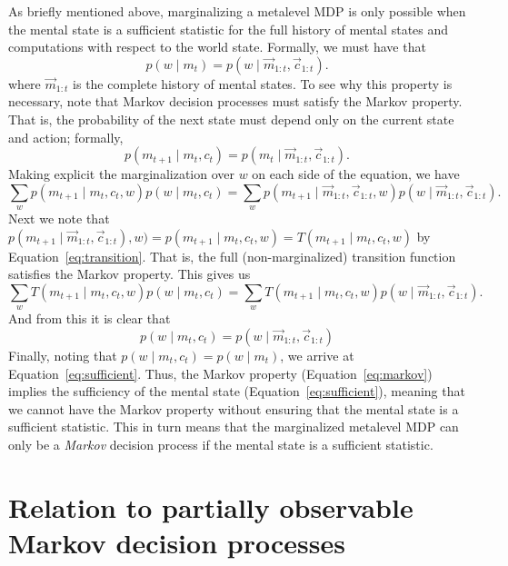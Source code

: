 As briefly mentioned above, marginalizing a metalevel MDP is only possible when the mental state is a sufficient statistic for the full history of mental states and computations with respect to the world state. Formally, we must have that
%
\begin{equation}\label{eq:sufficient}
  p(w \mid m_t) = p(w \mid \vec{m}_{1:t}, \vec{c}_{1:t}).
\end{equation}
%
where $\vec{m}_{1:t}$ is the complete history of mental states. To see why this property is necessary, note that Markov decision processes must satisfy the Markov property. That is, the probability of the next state must depend only on the current state and action; formally,
\begin{equation}\label{eq:markov}
  p(m_{t+1} \mid m_t, c_t) = p(m_t \mid \vec{m}_{1:t}, \vec{c}_{1:t}).
\end{equation}
Making explicit the marginalization over $w$ on each side of the equation, we have
\begin{equation}
  \sum_w p(m_{t+1} \mid m_t, c_t, w) p(w \mid m_t, c_t) =
  \sum_w p(m_{t+1} \mid \vec{m}_{1:t}, \vec{c}_{1:t}, w) p(w \mid \vec{m}_{1:t}, \vec{c}_{1:t}).
\end{equation}
Next we note that $p(m_{t+1} \mid \vec{m}_{1:t}, \vec{c}_{1:t}), w) = p(m_{t+1} \mid m_t, c_t, w) = T(m_{t+1} \mid m_t, c_t, w)$ by Equation~\ref{eq:transition}. That is, the full (non-marginalized) transition function satisfies the Markov property. This gives us
\begin{equation}
  \sum_w T(m_{t+1} \mid m_t, c_t, w) p(w \mid m_t, c_t) =
  \sum_w T(m_{t+1} \mid m_t, c_t, w) p(w \mid \vec{m}_{1:t}, \vec{c}_{1:t}).
\end{equation}
And from this it is clear that 
%
\begin{equation}
  p(w \mid m_t, c_t) = p(w \mid \vec{m}_{1:t}, \vec{c}_{1:t})
\end{equation}
%
Finally, noting that $p(w \mid m_t, c_t) = p(w \mid m_t)$, we arrive at Equation~\ref{eq:sufficient}. Thus, the Markov property (Equation~\ref{eq:markov}) implies the sufficiency of the mental state (Equation~\ref{eq:sufficient}), meaning that we cannot have the Markov property without ensuring that the mental state is a sufficient statistic. This in turn means that the marginalized metalevel MDP can only be a \emph{Markov} decision process if the mental state is a sufficient statistic.

\section{Relation to partially observable Markov decision processes}\label{eq:metamdp-pomdp}


